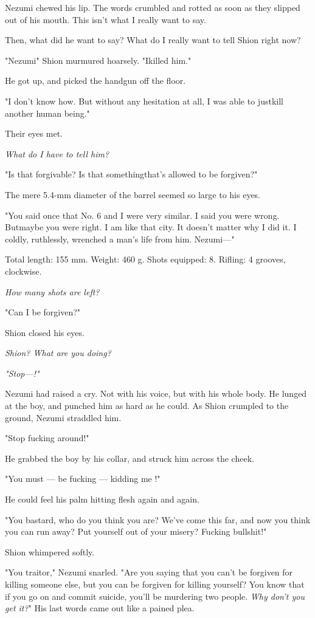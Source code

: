 Nezumi chewed his lip. The words crumbled and rotted as soon as they
slipped out of his mouth. This isn't what I really want to say.

Then, what did he want to say? What do I really want to tell Shion right
now?

"Nezumi\el " Shion murmured hoarsely. "I\el killed him."

He got up, and picked the handgun off the floor.

"I don't know how. But without any hesitation at all, I was able to
just\el kill another human being."

Their eyes met.

\emph{What do I have to tell him?}

"Is that forgivable? Is that something\el that's allowed to be
forgiven?"

The mere 5.4-mm diameter of the barrel seemed so large to his eyes.

"You said once that No. 6 and I were very similar. I said you were
wrong. But\el maybe you were right. I am like that city. It doesn't
matter why I did it. I coldly, ruthlessly, wrenched a man's life from
him. Nezumi---"

Total length: 155 mm. Weight: 460 g. Shots equipped: 8. Rifling: 4
grooves, clockwise.

\emph{How many shots are left?}

"Can I be forgiven\el ?"

Shion closed his eyes.

\emph{Shion? What are you doing?}

\emph{"Stop---!"}

Nezumi had raised a cry. Not with his voice, but with his whole body. He
lunged at the boy, and punched him as hard as he could. As Shion
crumpled to the ground, Nezumi straddled him.

"Stop fucking around!"

He grabbed the boy by his collar, and struck him across the cheek.

"You must --- be fucking --- kidding me !"

He could feel his palm hitting flesh again and again.

"You bastard, who do you think you are? We've come this far, and now you
think you can run away? Put yourself out of your misery? Fucking
bullshit!"

Shion whimpered softly.

"You traitor," Nezumi snarled. "Are you saying that you can't be
forgiven for killing someone else, but you can be forgiven for killing
yourself? You know that if you go on and commit suicide, you'll be
murdering two people. \emph{Why don't you get it?}" His last words came out
like a pained plea.

